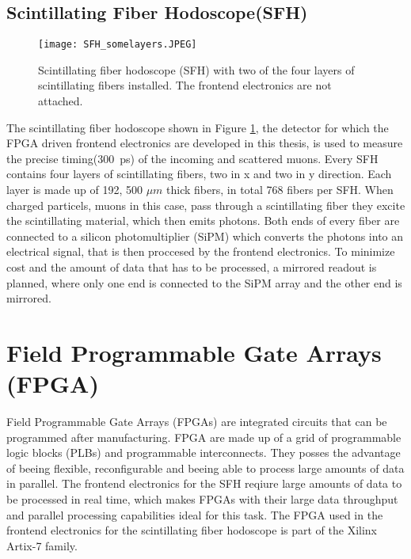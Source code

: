 \subsection{Scintillating Fiber Hodoscope(SFH)}
\begin{figure}[H]
	\centering
	\texttt{[image: SFH\_somelayers.JPEG]}
	\caption{Scintillating fiber hodoscope (SFH) with two of the four layers of scintillating fibers installed. The frontend electronics are not attached.\autocite{InternalcommunicationKarl}}
	\label{SFHpicture}
\end{figure}
The scintillating fiber hodoscope shown in Figure \ref{SFHpicture}, 
the detector for which the FPGA driven frontend electronics are developed in this thesis,
is used to measure the precise timing(\SI{300}{\pico\second}\Autocite{Amber2022Status}) of the incoming and scattered muons. 
Every SFH contains four layers of scintillating fibers, two in x and two in y direction.
Each layer is made up of 192\autocite{Amber2022Status}, 500 $\mu m$ thick\autocite{Amber2024Status} fibers, in total 768\autocite{Amber2022Status} fibers per SFH. 
When charged particels, muons in this case, pass through a scintillating fiber they excite the scintillating material, 
which then emits photons. Both ends of every fiber are connected to a silicon photomultiplier (SiPM) which converts the photons into an electrical signal,
that is then proccesed by the frontend electronics. To minimize cost and the amount of data that has to be processed, a mirrored readout is planned, 
where only one end is connected to the SiPM array and the other end is mirrored.\autocite{InternalcommunicationKarl}

\section{Field Programmable Gate Arrays (FPGA)}\label{sec:FPGA}
Field Programmable Gate Arrays (FPGAs) are integrated circuits that can be programmed after manufacturing.
FPGA are made up of a grid of programmable logic blocks (PLBs) and programmable interconnects.
They posses the advantage of beeing flexible, reconfigurable and beeing able to process large amounts of data in parallel.
The frontend electronics for the SFH reqiure large amounts of data to be processed in real time, which makes FPGAs with their large data throughput and parallel processing capabilities ideal for this task.\autocite{FPGA_reviewDSP}
\newline
The FPGA used in the frontend electronics for the scintillating fiber hodoscope is part of the Xilinx Artix-7 family.\autocite{InternalcommunicationIgor}

